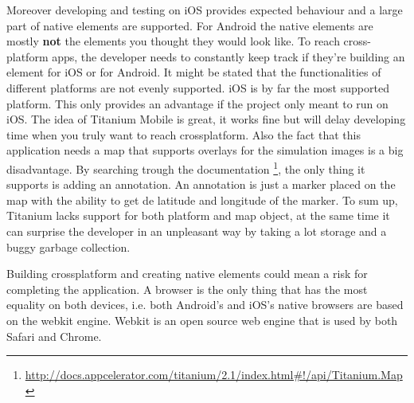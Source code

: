 Moreover developing and testing on iOS provides expected behaviour and a large part of native elements are supported. For Android the native elements are mostly \textbf{not} the elements you thought they would look like. To reach cross-platform apps, the developer needs to constantly keep track if they're building an element for iOS or for Android. It might be stated that the functionalities of different platforms are not evenly supported. iOS is by far the most supported platform. This only provides an advantage if the project only meant to run on iOS. The idea of Titanium Mobile is great, it works fine but will delay developing time when you truly want to reach crossplatform. Also the fact that this application needs a map that supports overlays for the simulation images is a big disadvantage. By searching trough the documentation \footnote{\url{http://docs.appcelerator.com/titanium/2.1/index.html\#!/api/Titanium.Map}}, the only thing it supports is adding an annotation. An annotation is just a marker placed on the map with the ability to get de latitude and longitude of the marker. To sum up, Titanium lacks support for both platform and map object, at the same time it can surprise the developer in an unpleasant way by taking a lot storage and a buggy garbage collection.

Building crossplatform and creating native elements could mean a risk for completing the application. A browser is the only thing that has the most equality on both devices, i.e. both Android's and iOS's native browsers are based on the webkit engine\cite{webkit}. Webkit is an open source web engine that is used by both Safari and Chrome.

